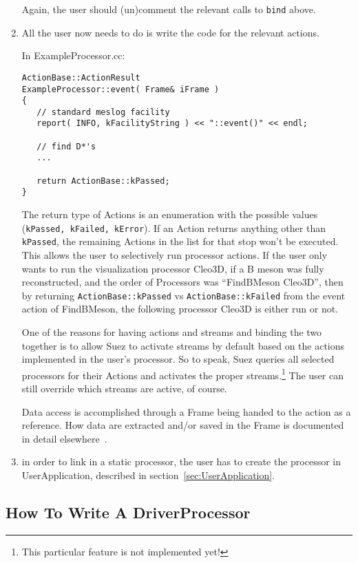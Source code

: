 \documentclass[12pt]{article}
\begin{document}
\begin{enumerate}
Again, the user should (un)comment the relevant calls to \texttt{bind}
above.

\item All the user now needs to do is write the code for the relevant
actions.

\noindent In ExampleProcessor.cc:
\begin{verbatim}
ActionBase::ActionResult
ExampleProcessor::event( Frame& iFrame )
{
   // standard meslog facility
   report( INFO, kFacilityString ) << "::event()" << endl;

   // find D*'s
   ...

   return ActionBase::kPassed;
}
\end{verbatim}

The return type of Actions is an enumeration with the possible values
(\texttt{kPassed, kFailed, kError}). If an Action returns anything other
than \texttt{kPassed}, the remaining Actions in the list for that stop
won't be executed. This allows the user to selectively run processor
actions. If the user only wants to run the visualization processor
Cleo3D, if a B meson was fully reconstructed, and the order of
Processors was ``FindBMeson Cleo3D'', then by returning
\texttt{ActionBase::kPassed} vs \texttt{ActionBase::kFailed} from the
event action of FindBMeson, the following processor Cleo3D is either run
or not.

One of the reasons for having actions and streams and binding the two
together is to allow Suez to activate streams by default based on the
actions implemented in the user's processor. So to speak, Suez queries
all selected processors for their Actions and activates the proper
streams.\footnote{This particular feature is not implemented yet!}  The
user can still override which streams are active, of course.

Data access is accomplished through a Frame being handed to the action
as a reference. How data are extracted and/or saved in the Frame is
documented in detail elsewhere~\cite{Delivery}.

\item in order to link in a static processor, the user has to create the
processor in UserApplication, described in
section~\ref{sec:UserApplication}.

\end{enumerate}


\subsection{How To Write A DriverProcessor }
\label{sec:HowToWriteADriverProcessor}
\end{document}
